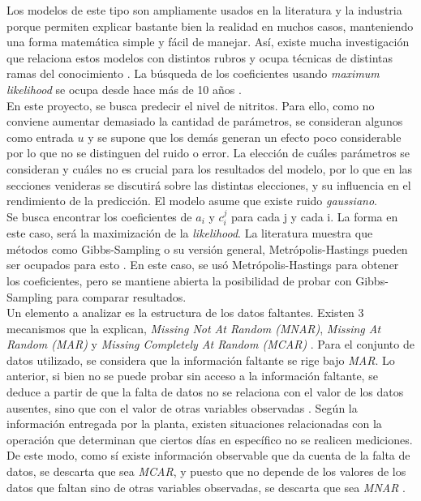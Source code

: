 \documentclass[letterpaper, 12pt]{article}
\begin{document}
Los modelos de este tipo son ampliamente usados en la literatura y la industria porque permiten explicar bastante bien la realidad en muchos casos, manteniendo una forma matemática simple y fácil de manejar. Así, existe mucha investigación que relaciona estos modelos con distintos rubros y ocupa técnicas de distintas ramas del conocimiento \cite{arma1}. La búsqueda de los coeficientes usando \textit{maximum likelihood} se ocupa desde hace más de 10 años \cite{arma2}.\\

En este proyecto, se busca predecir el nivel de nitritos. Para ello, como no conviene aumentar demasiado la cantidad de parámetros, se consideran algunos como entrada $u$ y se supone que los demás generan un efecto poco considerable por lo que no se distinguen del ruido o error. La elección de cuáles parámetros se consideran y cuáles no es crucial para los resultados del modelo, por lo que en las secciones venideras se discutirá sobre las distintas elecciones, y su influencia en el rendimiento de la predicción. El modelo asume que existe ruido \textit{gaussiano}.\\

Se busca encontrar los coeficientes de $a_{i}$ y $c_{i}^{j}$ para cada j y cada i. La forma en este caso, será la maximización de la \textit{likelihood}. La literatura muestra que métodos como Gibbs-Sampling o su versión general, Metrópolis-Hastings pueden ser ocupados para esto \cite{arma-gibbs}. En este caso, se usó Metrópolis-Hastings para obtener los coeficientes, pero se mantiene abierta la posibilidad de probar con Gibbs-Sampling para comparar resultados.\\

Un elemento a analizar es la estructura de los datos faltantes. Existen 3 mecanismos que la explican, \textit{Missing Not At Random (MNAR)}, \textit{Missing At Random (MAR)} y \textit{Missing Completely At Random (MCAR)} \cite{mcnar}. Para el conjunto de datos utilizado, se considera que la información faltante se rige bajo \textit{MAR}. Lo anterior, si bien no se puede probar sin acceso a la información faltante, se deduce a partir de que la falta de datos no se relaciona con el valor de los datos ausentes, sino que con el valor de otras variables observadas \cite{mcnar}. Según la información entregada por la planta, existen situaciones relacionadas con la operación que determinan que ciertos días en específico no se realicen mediciones. De este modo, como sí existe información observable que da cuenta de la falta de datos, se descarta que sea \textit{MCAR}, y puesto que no depende de los valores de los datos que faltan sino de otras variables observadas, se descarta que sea \textit{MNAR} \cite{mcnar}.\\
\end{document}
